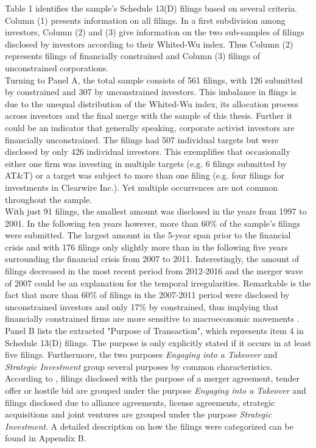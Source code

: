 \documentclass[12pt]{article}
\begin{document}
Table 1 identifies the sample's Schedule 13(D) filings based on several criteria. Column (1) presents information on all filings. In a first subdivision among investors, Column (2) and (3) give information on the two sub-samples of filings disclosed by investors according to their Whited-Wu index. Thus Column (2) represents filings of financially constrained and Column (3) filings of unconstrained corporations.\\
Turning to Panel A, the total sample consists of 561 filings, with 126 submitted by constrained and 307 by unconstrained investors. This imbalance in flings is due to the unequal distribution of the Whited-Wu index, its allocation process across investors and the final merge with the sample of this thesis. Further it could be an indicator that generally speaking, corporate activist investors are financially unconstrained. The filings had 507 individual targets but were disclosed by only 426 individual investors. This exemplifies that occasionally either one firm was investing in multiple targets (e.g. 6 filings submitted by AT\&T) or a target was subject to more than one filing (e.g. four filings for investments in Clearwire Inc.). Yet multiple occurrences are not common throughout the sample.\\ 
With just 91 filings, the smallest amount was disclosed in the years from 1997 to 2001. In the following ten years however, more than 60\% of the sample's filings were submitted. The largest amount in the 5-year span prior to the financial crisis and with 176 filings only slightly more than in the following five years surrounding the financial crisis from 2007 to 2011. Interestingly, the amount of filings decreased in the most recent period from 2012-2016 and the merger wave of 2007 \citep[p.19]{Huang2017} could be an explanation for the temporal irregularities. Remarkable is the fact that more than 60\% of filings in the 2007-2011 period were disclosed by unconstrained investors and only 17\% by constrained, thus implying that financially constrained firms are more sensitive to macroeconomic movements \citep[p.1197]{Campello2006}.\\
Panel B lists the extracted "Purpose of Transaction", which represents item 4 in Schedule 13(D) filings. The purpose is only explicitly stated if it occurs in at least five filings. Furthermore, the two purposes \emph{Engaging into a Takeover} and \emph{Strategic Investment} group several purposes by common characteristics. According to \citet[p.1]{Betton2008}, filings disclosed with the purpose of a merger agreement, tender offer or hostile bid are grouped under the purpose \emph{Engaging into a Takeover} and filings disclosed due to alliance agreements, license agreements, strategic acquisitions and joint ventures are grouped under the purpose \emph{Strategic Investment}. A detailed description on how the filings were categorized can be found in Appendix B. 
\end{document}
